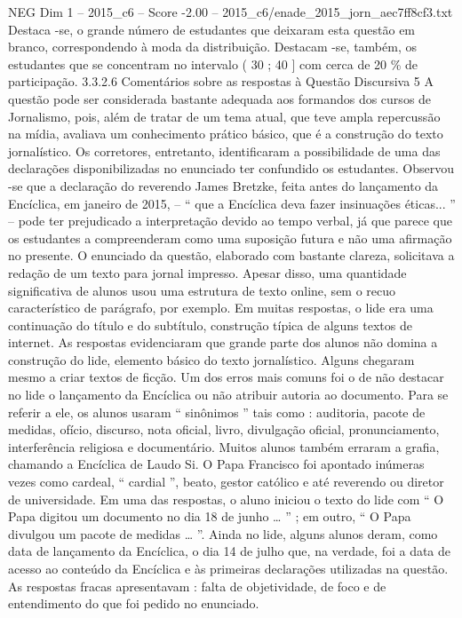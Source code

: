 \begin{textsample}{NEG Dim 1 – 2015\_c6 – Score -2.00 – 2015\_c6/enade\_2015\_jorn\_aec7ff8cf3.txt}
Destaca -se, o grande número de estudantes que deixaram esta questão em branco, correspondendo à moda da distribuição.
Destacam -se, também, os estudantes que se concentram no intervalo ( 30 ; 40 ] com cerca de 20 \% de participação. 3.3.2.6 Comentários sobre as respostas à Questão Discursiva 5 A questão pode ser considerada bastante adequada aos formandos dos cursos de Jornalismo, pois, além de tratar de um tema atual, que teve ampla repercussão na mídia, avaliava um conhecimento prático básico, que é a construção do texto jornalístico.
Os corretores, entretanto, identificaram a possibilidade de uma das declarações disponibilizadas no enunciado ter confundido os estudantes.
Observou -se que a declaração do reverendo James Bretzke, feita antes do lançamento da Encíclica, em janeiro de 2015, – “ que a Encíclica deva fazer insinuações éticas... ” – pode ter prejudicado a interpretação devido ao tempo verbal, já que parece que os estudantes a compreenderam como uma suposição futura e não uma afirmação no presente.
O enunciado da questão, elaborado com bastante clareza, solicitava a redação de um texto para jornal impresso.
Apesar disso, uma quantidade significativa de alunos usou uma estrutura de texto online, sem o recuo característico de parágrafo, por exemplo.
Em muitas respostas, o lide era uma continuação do título e do subtítulo, construção típica de alguns textos de internet.
As respostas evidenciaram que grande parte dos alunos não domina a construção do lide, elemento básico do texto jornalístico.
Alguns chegaram mesmo a criar textos de ficção.
Um dos erros mais comuns foi o de não destacar no lide o lançamento da Encíclica ou não atribuir autoria ao documento.
Para se referir a ele, os alunos usaram “ sinônimos ” tais como : auditoria, pacote de medidas, ofício, discurso, nota oficial, livro, divulgação oficial, pronunciamento, interferência religiosa e documentário.
Muitos alunos também erraram a grafia, chamando a Encíclica de Laudo Si.
O Papa Francisco foi apontado inúmeras vezes como cardeal, “ cardial ”, beato, gestor católico e até reverendo ou diretor de universidade.
Em uma das respostas, o aluno iniciou o texto do lide com “ O Papa digitou um documento no dia 18 de junho … ” ; em outro, “ O Papa divulgou um pacote de medidas … ”.
Ainda no lide, alguns alunos deram, como data de lançamento da Encíclica, o dia 14 de julho que, na verdade, foi a data de acesso ao conteúdo da Encíclica e às primeiras declarações utilizadas na questão.
As respostas fracas apresentavam : falta de objetividade, de foco e de entendimento do que foi pedido no enunciado.

\end{textsample}
